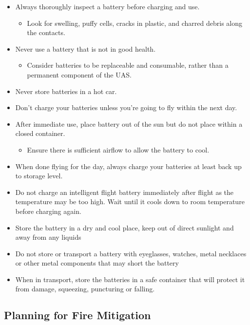 \documentclass[
  12pt,
]{book}
\providecommand{\tightlist}{%
  \setlength{\itemsep}{0pt}\setlength{\parskip}{0pt}}
\begin{document}
\begin{itemize}
\item
  Always thoroughly inspect a battery before charging and use.

  \begin{itemize}
  \tightlist
  \item
    Look for swelling, puffy cells, cracks in plastic, and charred debris along the contacts.
  \end{itemize}
\item
  Never use a battery that is not in good health.

  \begin{itemize}
  \tightlist
  \item
    Consider batteries to be replaceable and consumable, rather than a permanent component of the UAS.
  \end{itemize}
\item
  Never store batteries in a hot car.
\item
  Don't charge your batteries unless you're going to fly within the next day.
\item
  After immediate use, place battery out of the sun but do not place within a closed container.

  \begin{itemize}
  \tightlist
  \item
    Ensure there is sufficient airflow to allow the battery to cool.
  \end{itemize}
\item
  When done flying for the day, always charge your batteries at least back up to storage level.
\item
  Do not charge an intelligent flight battery immediately after flight as the temperature may be too high. Wait until it cools down to room temperature before charging again.
\item
  Store the battery in a dry and cool place, keep out of direct sunlight and away from any liquids
\item
  Do not store or transport a battery with eyeglasses, watches, metal necklaces or other metal components that may short the battery
\item
  When in transport, store the batteries in a safe container that will protect it from damage, squeezing, puncturing or falling.
\end{itemize}

\subsection{Planning for Fire Mitigation}\label{planning-for-fire-mitigation}
\end{document}
